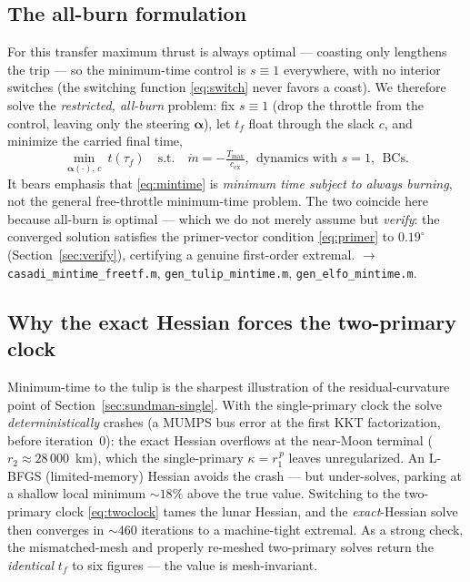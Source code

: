 \documentclass[11pt]{article}
\newcommand{\file}[1]{\texttt{\small #1}}
\newcommand{\uv}{\boldsymbol{\alpha}}
\newcommand{\Tmax}{T_{\max}}
\newcommand{\rE}{r_1}
\newcommand{\rM}{r_2}
\begin{document}
\subsection{The all-burn formulation}
For this transfer maximum thrust is always optimal --- coasting only lengthens
the trip --- so the minimum-time control is $s\equiv1$ everywhere, with no
interior switches (the switching function \eqref{eq:switch} never favors a
coast). We therefore solve the \emph{restricted, all-burn} problem: fix
$s\equiv1$ (drop the throttle from the control, leaving only the steering
$\uv$), let $t_f$ float through the slack $c$, and minimize the carried final
time,
\begin{equation}
  \min_{\uv(\cdot),\,c}\ t(\tau_f)
  \quad\text{s.t.}\quad
  \dot m = -\tfrac{\Tmax}{c_{\text{ex}}},\ \ \text{dynamics with }s=1,\ \ \text{BCs}.
  \label{eq:mintime}
\end{equation}
It bears emphasis that \eqref{eq:mintime} is \emph{minimum time subject to always
burning}, not the general free-throttle minimum-time problem. The two coincide
here because all-burn is optimal --- which we do not merely assume but
\emph{verify}: the converged solution satisfies the primer-vector condition
\eqref{eq:primer} to $0.19^\circ$ (Section~\ref{sec:verify}), certifying a genuine
first-order extremal. $\rightarrow$ \file{casadi\_mintime\_freetf.m},
\file{gen\_tulip\_mintime.m}, \file{gen\_elfo\_mintime.m}.

\subsection{Why the exact Hessian forces the two-primary clock}
Minimum-time to the tulip is the sharpest illustration of the residual-curvature
point of Section~\ref{sec:sundman-single}. With the single-primary clock the
solve \emph{deterministically} crashes (a MUMPS bus error at the first KKT
factorization, before iteration~0): the exact Hessian overflows at the near-Moon
terminal ($\rM\approx28\,000$~km), which the single-primary $\kappa=\rE^{\,p}$
leaves unregularized. An L-BFGS (limited-memory) Hessian avoids the crash --- but
under-solves, parking at a shallow local minimum $\sim\!18\%$ above the true
value. Switching to the two-primary clock \eqref{eq:twoclock} tames the lunar
Hessian, and the \emph{exact}-Hessian solve then converges in $\sim\!460$
iterations to a machine-tight extremal. As a strong check, the mismatched-mesh
and properly re-meshed two-primary solves return the \emph{identical} $t_f$ to
six figures --- the value is mesh-invariant.
\end{document}

